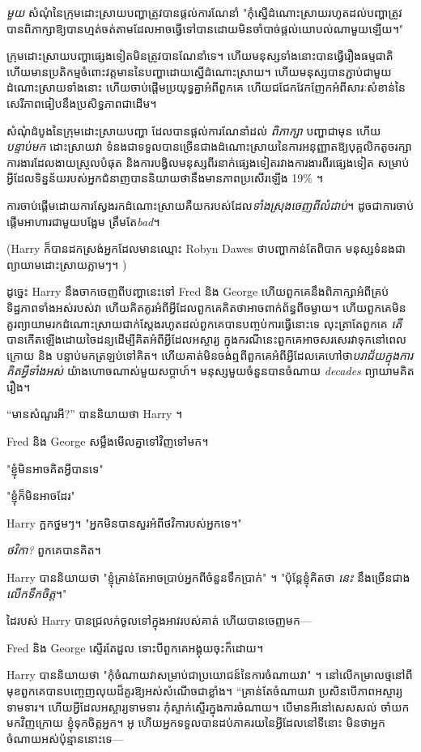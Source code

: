 {{\emph{មួយ} សំណុំនៃក្រុមដោះស្រាយបញ្ហាត្រូវបានផ្តល់ការណែនាំ "កុំស្នើដំណោះស្រាយរហូតដល់បញ្ហាត្រូវបានពិភាក្សាឱ្យបានហ្មត់ចត់តាមដែលអាចធ្វើទៅបានដោយមិនចាំបាច់ផ្តល់យោបល់ណាមួយឡើយ។"

ក្រុមដោះស្រាយបញ្ហាផ្សេងទៀតមិនត្រូវបានណែនាំទេ។ ហើយមនុស្សទាំងនោះបានធ្វើរឿងធម្មជាតិ ហើយមានប្រតិកម្មចំពោះវត្តមាននៃបញ្ហាដោយស្នើដំណោះស្រាយ។ ហើយមនុស្សបានភ្ជាប់ជាមួយដំណោះស្រាយទាំងនោះ ហើយចាប់ផ្តើមប្រយុទ្ធគ្នាអំពីពួកគេ ហើយជជែកវែកញែកអំពីសារៈសំខាន់នៃសេរីភាពធៀបនឹងប្រសិទ្ធភាពជាដើម។

សំណុំដំបូងនៃក្រុមដោះស្រាយបញ្ហា ដែលបានផ្តល់ការណែនាំដល់ \emph{ពិភាក្សា} បញ្ហាជាមុន ហើយ\emph{បន្ទាប់មក} ដោះស្រាយវា ទំនងជាទទួលបានច្រើនជាងដំណោះស្រាយនៃការអនុញ្ញាតឱ្យបុគ្គលិកតូចរក្សា ការងារដែលងាយស្រួលបំផុត និងការបង្វិលមនុស្សពីរនាក់ផ្សេងទៀតរវាងការងារពីរផ្សេងទៀត សម្រាប់អ្វីដែលទិន្នន័យរបស់អ្នកជំនាញបាននិយាយថានឹងមានភាពប្រសើរឡើង 19\% ។

ការចាប់ផ្តើមដោយការស្វែងរកដំណោះស្រាយគឺយករបស់ដែល\emph{ទាំងស្រុងចេញពីលំដាប់}។ ដូចជាការចាប់ផ្តើមអាហារជាមួយបង្អែម ត្រឹមតែ\emph{bad}។

(Harry ក៏បានដកស្រង់អ្នកដែលមានឈ្មោះ Robyn Dawes ថាបញ្ហាកាន់តែពិបាក មនុស្សទំនងជាព្យាយាមដោះស្រាយភ្លាមៗ។ )

ដូច្នេះ Harry នឹងចាកចេញពីបញ្ហានេះទៅ Fred និង George ហើយពួកគេនឹងពិភាក្សាអំពីគ្រប់ទិដ្ឋភាពទាំងអស់របស់វា ហើយគិតគូរអំពីអ្វីដែលពួកគេគិតថាអាចពាក់ព័ន្ធពីចម្ងាយ។ ហើយពួកគេមិនគួរព្យាយាមរកដំណោះស្រាយជាក់ស្តែងរហូតដល់ពួកគេបានបញ្ចប់ការធ្វើនោះទេ លុះត្រាតែពួកគេ \emph{តើ} បានកើតឡើងដោយចៃដន្យដើម្បីគិតអំពីអ្វីដែលអស្ចារ្យ ក្នុងករណីនេះពួកគេអាចសរសេរវាទុកនៅពេលក្រោយ និង បន្ទាប់មកត្រឡប់ទៅគិត។ ហើយគាត់មិនចង់ឮពីពួកគេអំពីអ្វីដែលគេហៅថា\emph{បរាជ័យក្នុងការគិតអ្វីទាំងអស់} យ៉ាងហោចណាស់មួយសប្តាហ៍។ មនុស្សមួយចំនួនបានចំណាយ \emph{decades} ព្យាយាមគិតរឿង។

“មានសំណួរអី?” បាននិយាយថា Harry ។

Fred និង George សម្លឹងមើលគ្នាទៅវិញទៅមក។

"ខ្ញុំមិនអាចគិតអ្វីបានទេ"

"ខ្ញុំក៏មិនអាចដែរ"

Harry ក្អក​ថ្នមៗ។ "អ្នកមិនបានសួរអំពីថវិការបស់អ្នកទេ។"

\emph{ថវិកា?} ពួកគេបានគិត។

Harry បាននិយាយថា "ខ្ញុំគ្រាន់តែអាចប្រាប់អ្នកពីចំនួនទឹកប្រាក់" ។ "ប៉ុន្តែខ្ញុំគិតថា \emph{នេះ} នឹងច្រើនជាង \emph{លើកទឹកចិត្ត}។"

ដៃរបស់ Harry បានជ្រលក់ចូលទៅក្នុងអាវរបស់គាត់ ហើយបានចេញមក—

Fred និង George ស្ទើរតែដួល ទោះបីពួកគេអង្គុយចុះក៏ដោយ។

Harry បាននិយាយថា "កុំចំណាយវាសម្រាប់ជាប្រយោជន៍នៃការចំណាយវា" ។ នៅ​លើ​កម្រាល​ថ្ម​នៅ​ពី​មុខ​ពួក​គេ​បាន​បញ្ចេញ​លុយ​ដ៏​គួរ​ឱ្យ​អស់​សំណើច​ជា​ខ្លាំង។ “គ្រាន់តែចំណាយវា ប្រសិនបើភាពអស្ចារ្យទាមទារ។ ហើយអ្វីដែលអស្ចារ្យទាមទារ កុំស្ទាក់ស្ទើរក្នុងការចំណាយ។ បើមានអីនៅសេសសល់ ចាំយកមកវិញក្រោយ ខ្ញុំទុកចិត្តអ្នក។ អូ ហើយអ្នកទទួលបានដប់ភាគរយនៃអ្វីដែលនៅទីនោះ មិនថាអ្នកចំណាយអស់ប៉ុន្មាននោះទេ—

}}

